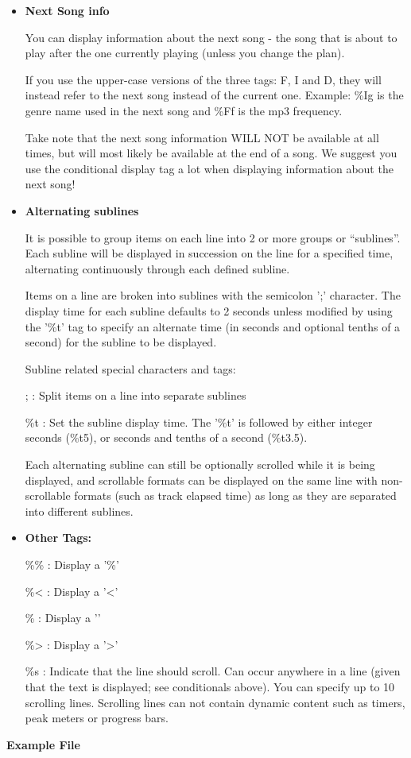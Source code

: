 \begin{itemize}
\item {\bfseries
Next Song info}

You can display information about the next song {}- the song that is
about to play after the one currently playing (unless you change the
plan). 

If you use the upper{}-case versions of the
three tags: F, I and D, they will instead refer to the next song
instead of the current one. Example: \%Ig is the genre name used in the
next song and \%Ff is the mp3 frequency. 

Take note that the next song information WILL NOT be available at all
times, but will most likely be available at the end of a song. We
suggest you use the conditional display tag a lot when displaying
information about the next song! 
\item {\bfseries
Alternating sublines}

It is possible to group items on each line into 2 or more groups or
``sublines''. Each subline will be displayed
in succession on the line for a specified time, alternating
continuously through each defined subline. 

Items on a line are broken into sublines with the semicolon
';' character. The display time for
each subline defaults to 2 seconds unless modified by using the
'\%t' tag to specify an alternate
time (in seconds and optional tenths of a second) for the subline to be
displayed. 

Subline related special characters and tags: 

;  : Split items on a line into separate sublines

\%t  : Set the subline display time. The
'\%t' is followed by either integer
seconds (\%t5), or seconds and tenths of a second (\%t3.5).

Each alternating subline can still be optionally scrolled while it is
being displayed, and scrollable formats can be displayed on the same
line with non{}-scrollable formats (such as track elapsed time) as long
as they are separated into different sublines. 
\item {\bfseries
Other Tags:}

\%\% : Display a '\%'

\%{\textless} : Display a
'{\textless}'

\%{\textbar} : Display a '{\textbar}'

\%{\textgreater} : Display a
'{\textgreater}'

\%s : Indicate that the line should scroll. Can occur anywhere in a line
(given that the text is displayed; see conditionals above). You can
specify up to 10 scrolling lines. Scrolling lines can not contain
dynamic content such as timers, peak meters or progress bars.
\end{itemize}
{\bfseries
Example File}

